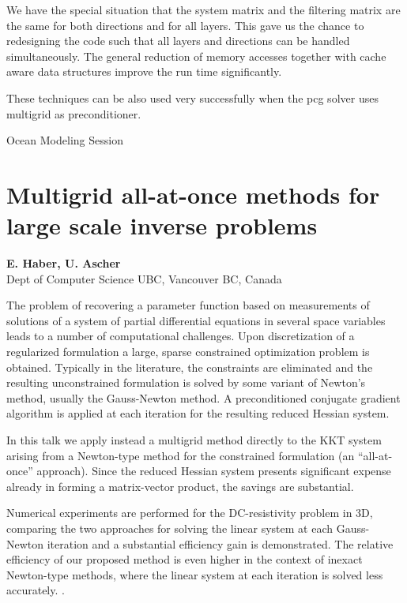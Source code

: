 \documentclass[11pt]{article}
\newcommand{\nextab}[4]{
	\section{#2}
	{\bf #1} \\ \nopagebreak
	{#3} \\ \nopagebreak
	{\tt #4} \nopagebreak
	}
\begin{document}
We have the special situation that the system matrix and the
filtering matrix are the same for both directions and
for all layers. This gave us the chance
to redesigning the code such that all layers and directions
can be handled simultaneously.
The general reduction of memory accesses together with
cache aware data structures improve the run time significantly.

These techniques can be also used very successfully when
the pcg solver uses multigrid as preconditioner.


Ocean Modeling Session



\nextab
{E. Haber, U. Ascher}
{Multigrid all-at-once methods for large scale inverse problems}
{Dept of Computer Science UBC, Vancouver BC, Canada}
{}


The problem of recovering a parameter function based on
measurements of solutions of a system of partial differential
equations in several space variables leads to a number of
computational challenges. Upon discretization of a regularized
formulation a large, sparse constrained optimization problem is
obtained.
Typically in the literature, the constraints are eliminated and
the resulting unconstrained formulation is solved by some variant
of Newton's method, usually the Gauss-Newton method. A
preconditioned conjugate gradient algorithm is applied at each
iteration for the resulting reduced Hessian system.

In this talk we apply instead a multigrid method directly to the
KKT system arising from a Newton-type method for the constrained
formulation (an ``all-at-once'' approach). Since the reduced
Hessian system presents significant expense already in forming
a matrix-vector product, the savings are substantial.

Numerical experiments are performed for the DC-resistivity
problem in 3D, comparing the two approaches for solving the
linear system at each Gauss-Newton iteration and a substantial
efficiency gain is demonstrated.
The relative efficiency of our proposed method is even higher in
the context of inexact Newton-type methods, where the linear
system at each iteration is solved less accurately. .



\end{document}

